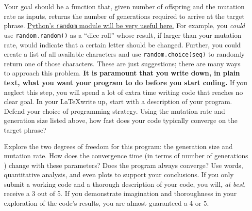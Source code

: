 \documentclass[12pt, letterpaper]{article}
\begin{document}
Your goal should be a function that, given number of offspring and the
mutation rate as inputs, returns the number of generations required to arrive
at the target phrase.  \href{https://docs.python.org/3/library/random.html}
{Python's {\tt random} module will be very useful here.}  For example, you
\emph{could} use {\tt random.random()} as a ``dice roll'' whose result, if
larger than your mutation rate, would indicate that a certain letter should
be changed.  Further, you could create a list of all available characters
and use {\tt random.choice(seq)} to randomly return one of those characters.
These are just suggestions; there are many ways to approach this problem.
\textbf{It is paramount that you write down, in plain text, what you want
  your program to do before you start coding.}  If you neglect this step, you
will spend a lot of extra time writing code that reaches no clear goal.
In your \LaTeX write up, start with a description of your program.  Defend
your choice of programming strategy.  Using the mutation rate and generation
size listed above, how fast does your code typically converge on the target
phrase?  

Explore the two degrees of freedom for this program: the generation size and
mutation rate.  How does the convergence time (in terms of number of generations
) change with these parameters?  Does the program always converge?  Use words,
quantitative analysis, and even plots to support your conclusions.  If you only
submit a working code and a thorough description of your code, you will, 
\emph{at best}, receive a 3 out of 5. If you demonstrate imagination and
thoroughness in your exploration of the code's results, you are almost
guaranteed a 4 or 5.
\end{document}
